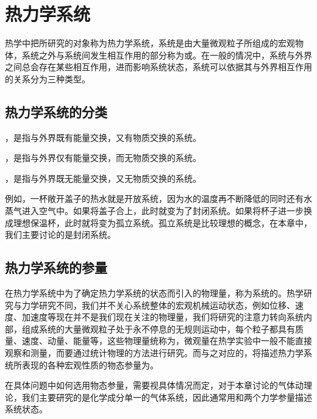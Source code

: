 \section{热力学系统}
\label{sec:热力学系统}
热学中把所研究的对象称为热力学系统，系统是由大量微观粒子所组成的宏观物体，系统之外与系统间发生相互作用的部分称为或。在一般的情况中，系统与外界之间总会存在某些相互作用，进而影响系统状态，系统可以依据其与外界相互作用的关系分为三种类型。

\subsection{热力学系统的分类}
\label{subsec:热力学系统的分类}
\begin{OldBoxDefinition}[开放系统]
    ，是指与外界既有能量交换，又有物质交换的系统。    
\end{OldBoxDefinition}

\begin{OldBoxDefinition}[封闭系统]
    ，是指与外界仅有能量交换，而无物质交换的系统。    
\end{OldBoxDefinition}

\begin{OldBoxDefinition}[孤立系统]
    ，是指与外界既无能量交换，又无物质交换的系统。    
\end{OldBoxDefinition}

例如，一杯敞开盖子的热水就是开放系统，因为水的温度再不断降低的同时还有水蒸气进入空气中。如果将盖子合上，此时就变为了封闭系统。如果将杯子进一步换成理想保温杯，此时就将变为孤立系统。孤立系统是比较理想的概念，在本章中，我们主要讨论的是封闭系统。\vspace{-0.2cm}

\subsection{热力学系统的参量}
\label{subsec:热力学系统的参量}
在热力学系统中为了确定热力学系统的状态而引入的物理量，称为系统的。热学研究与力学研究不同，我们并不关心系统整体的宏观机械运动状态，例如位移、速度、加速度等现在并不是我们现在关注的物理量，我们将研究的注意力转向系统内部，组成系统的大量微观粒子处于永不停息的无规则运动中，每个粒子都具有质量、速度、动量、能量等，这些物理量统称为，微观量在热学实验中一般不能直接观察和测量，而要通过统计物理的方法进行研究。而与之对应的，将描述热力学系统所表现的各种宏观性质的物态参量为。

在具体问题中如何选用物态参量，需要视具体情况而定，对于本章讨论的气体动理论，我们主要研究的是化学成分单一的气体系统，因此通常用和两个力学参量描述系统状态。

